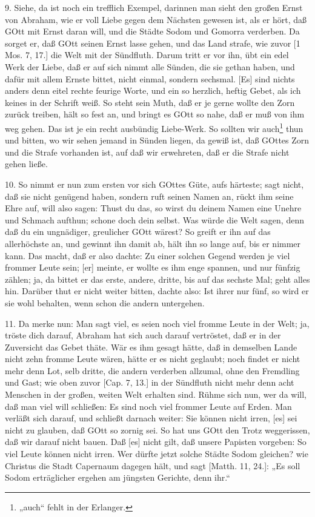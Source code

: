 9. Siehe, da ist noch ein trefflich Exempel, darinnen man sieht den großen Ernst von Abraham, wie er voll Liebe gegen dem Nächsten gewesen ist, als er hört, daß GOtt mit Ernst daran will, und die Städte Sodom und Gomorra verderben. Da sorget er, daß GOtt seinen Ernst lasse gehen, und das Land strafe, wie zuvor [1 Mos. 7, 17.] die Welt mit der Sündfluth. Darum tritt er vor ihn, übt ein edel Werk der Liebe, daß er auf sich nimmt alle Sünden, die sie gethan haben, und dafür mit allem Ernste bittet, nicht einmal, sondern sechsmal. [Es] sind nichts anders denn eitel rechte feurige Worte, und ein so herzlich, heftig Gebet, als ich keines in der Schrift weiß. So steht sein Muth, daß er je gerne wollte den Zorn zurück treiben, hält so fest an, und bringt es GOtt so nahe, daß er muß von ihm weg gehen. Das ist je ein recht ausbündig Liebe-Werk. So sollten wir auch\footnote{„auch“ fehlt in der Erlanger.} thun und bitten, wo wir sehen jemand in Sünden liegen, da gewiß ist, daß GOttes Zorn und die Strafe vorhanden ist, auf daß wir erwehreten, daß er die Strafe nicht gehen ließe.

10. So nimmt er nun zum ersten vor sich GOttes Güte, aufs härteste; sagt nicht, daß sie nicht genügend haben, sondern ruft seinen Namen an, rückt ihm seine Ehre auf, will also sagen: Thust du das, so wirst du deinem Namen eine Unehre und Schmach aufthun; schone doch dein selbst. Was würde die Welt sagen, denn daß du ein ungnädiger, greulicher GOtt wärest? So greift er ihn auf das allerhöchste an, und gewinnt ihn damit ab, hält ihn so lange auf, bis er nimmer kann. Das macht, daß er also dachte: Zu einer solchen Gegend werden je viel frommer Leute sein; [er] meinte, er wollte es ihm enge spannen, und nur fünfzig zählen; ja, da bittet er das erste, andere, dritte, bis auf das sechste Mal; geht alles hin. Darüber thut er nicht weiter bitten, dachte also: Ist ihrer nur fünf, so wird er sie wohl behalten, wenn schon die andern untergehen.

11. Da merke nun: Man sagt viel, es seien noch viel fromme Leute in der Welt; ja, tröste dich darauf, Abraham hat sich auch darauf vertröstet, daß er in der Zuversicht das Gebet thäte. Wär es ihm gesagt hätte, daß in demselben Lande nicht zehn fromme Leute wären, hätte er es nicht geglaubt; noch findet er nicht mehr denn Lot, selb dritte, die andern verderben allzumal, ohne den Fremdling und Gast; wie oben zuvor [Cap. 7, 13.] in der Sündfluth nicht mehr denn acht Menschen in der großen, weiten Welt erhalten sind. Rühme sich nun, wer da will, daß man viel will schließen: Es sind noch viel frommer Leute auf Erden. Man verläßt sich darauf, und schließt darnach weiter: Sie können nicht irren, [es] sei nicht zu glauben, daß GOtt so zornig sei. So hat uns GOtt den Trotz weggerissen, daß wir darauf nicht bauen. Daß [es] nicht gilt, daß unsere Papisten vorgeben: So viel Leute können nicht irren. Wer dürfte jetzt solche Städte Sodom gleichen? wie Christus die Stadt
Capernaum dagegen hält, und sagt [Matth. 11, 24.]: „Es soll Sodom erträglicher ergehen am jüngsten Gerichte, denn ihr.“

